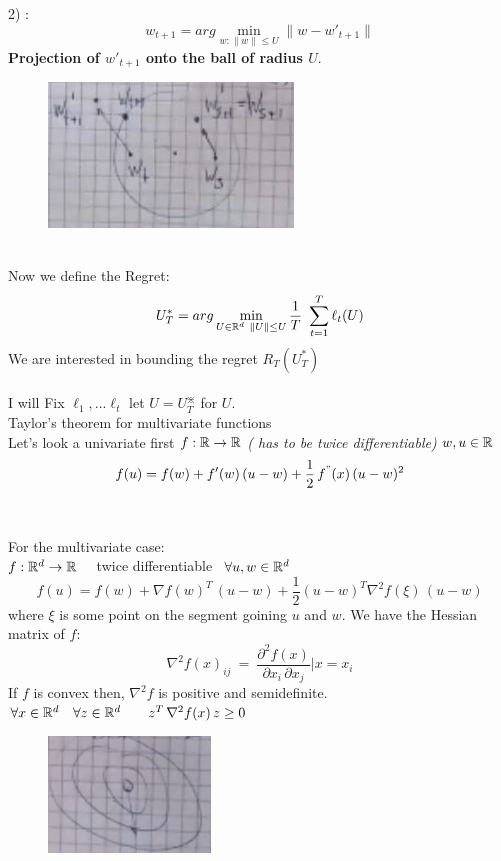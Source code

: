 \documentclass[../main.tex]{subfiles}
\begin{document}
2) : $$
w_{t+1} = arg \min_{w: \| w \| \leq U} \| w- w'_{t+1} \| $$ \textbf{Projection of $w'_{t+1}$ onto the ball of radius $U$}.
\begin{figure}[h]
    \centering
    \includegraphics[width=0.3\linewidth]{../img/lez15-img2.JPG}
    \caption{}
\end{figure}\\
Now we define the Regret:
$$
U^*_T = arg \min_{U \in \mathbb{R}^d \ \|U \| \leq U} \frac{1}{T} \ \sum_{t=1}^{T} \ell_t(U)
$$
We are interested in bounding the regret $R_T\left(U^*_T\right) $
\\\\
I will Fix $\ell_1, ... \ell_t$ \qquad let $U= U^{\divideontimes}_T$ for $U$.
\\
Taylor's theorem for multivariate functions\\
Let's look a univariate first \quad $f: \mathbb{R} \rightarrow \mathbb{R}$ \textit{( has to be twice differentiable) }\qquad $w, u \in \mathbb{R}$
$$
f(u) = f(w) + f'(w) \, (u-w) + \frac{1}{2} \, f^"(x) \, (u-w)^2
$$
\\\\
For the multivariate case:
\\
$f: \mathbb{R}^d \rightarrow \mathbb{R} \quad$ twice differentiable \ $ \forall u, w \in \mathbb{R}^d$
$$
f(u) = f(w) + \nabla f(w)^T \, (u-w) + \frac{1}{2} \left(u-w\right)^T \nabla^2 f(\xi) \, (u-w)
$$
where $\xi$ is some point on the segment goining $u$ and $w$.
We have the Hessian matrix of $f$:
$$
\nabla^2 f(x)_{ij} \ = \ \frac{\partial^2 f(x)}{\partial x_i \, \partial x_j} \vert x=x_i
$$
If $f$ is convex then, $\nabla^2 f$ is positive and semidefinite.\\
$
\forall x \in \mathbb{R}^d \quad \forall z \in \mathbb{R}^d \qquad z^T \, \nabla^2 f(x) \, z \geq 0
$
\begin{figure}[h]
    \centering
    \includegraphics[width=0.3\linewidth]{../img/lez15-img3.JPG}
    \caption{}
\end{figure}\\
\end{document}

